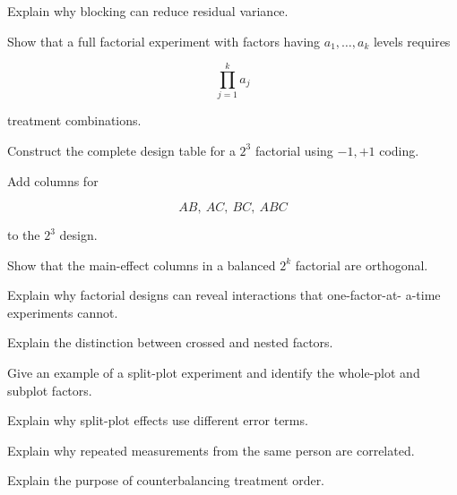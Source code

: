 \begin{exercise}[3]
Explain why blocking can reduce residual variance.
\end{exercise}

\begin{exercise}[3]
Show that a full factorial experiment with factors having
\(a_1,\ldots,a_k\) levels requires

\[
\prod_{j=1}^{k}a_j
\]

treatment combinations.
\end{exercise}

\begin{exercise}[3]
Construct the complete design table for a \(2^3\) factorial using
\(-1,+1\) coding.
\end{exercise}

\begin{exercise}[3]
Add columns for

\[
AB,\ AC,\ BC,\ ABC
\]

to the \(2^3\) design.
\end{exercise}

\begin{exercise}[3]
Show that the main-effect columns in a balanced \(2^k\) factorial are
orthogonal.
\end{exercise}

\begin{exercise}[3]
Explain why factorial designs can reveal interactions that one-factor-at-
a-time experiments cannot.
\end{exercise}

\begin{exercise}[3]
Explain the distinction between crossed and nested factors.
\end{exercise}

\begin{exercise}[3]
Give an example of a split-plot experiment and identify the whole-plot
and subplot factors.
\end{exercise}

\begin{exercise}[3]
Explain why split-plot effects use different error terms.
\end{exercise}

\begin{exercise}[3]
Explain why repeated measurements from the same person are correlated.
\end{exercise}

\begin{exercise}[3]
Explain the purpose of counterbalancing treatment order.
\end{exercise}

